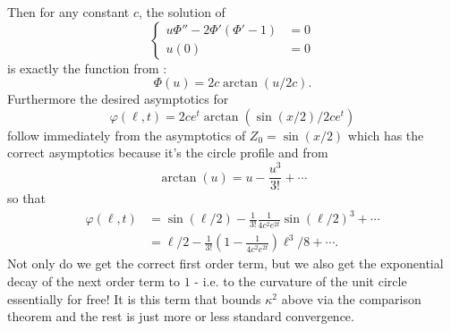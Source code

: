\documentclass{amsart}
\begin{document}
Then for any constant \(c\), the solution of
\[
\begin{cases}
u \Phi'' - 2 \Phi'(\Phi' - 1) &= 0 \\
u(0) &= 0
\end{cases}
\]
is exactly the function from \cite{AndrewsBryan:01/2011}:
\[
\Phi(u) = 2 c \arctan(u/2c).
\]
Furthermore the desired asymptotics for
\[
\varphi(\ell, t) = 2c e^t \arctan(\sin(x/2)/2c e^t)
\]
follow immediately from the asymptotics of \(Z_0 = \sin(x/2)\) which has the correct asymptotics because it's the circle profile and from
\[
\arctan(u) = u - \frac{u^3}{3!} + \cdots
\]
so that
\[
\begin{split}
\varphi(\ell, t) &= \sin(\ell/2) - \frac{1}{3!} \frac{1}{4c^2 e^{2t}} \sin(\ell/2)^3 + \cdots \\
&= \ell/2 - \frac{1}{3!} \left(1 - \frac{1}{4c^2 e^{2t}}\right) \ell^3/8 + \cdots.
\end{split}
\]
Not only do we get the correct first order term, but we also get the exponential decay of the next order term to \(1\) - i.e. to the curvature of the unit circle essentially for free! It is this term that bounds \(\kappa^2\) above via the comparison theorem and the rest is just more or less standard convergence.
\end{document}
